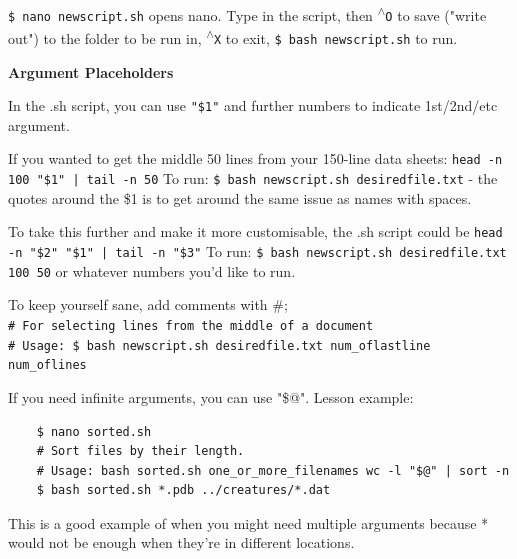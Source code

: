 \documentclass[12pt]{article}
\begin{document}
\texttt{\$ nano newscript.sh} opens nano. Type in the script, then \texttt{\textsuperscript{$\wedge$}O} to save ("write out") to the folder to be run in, \texttt{\textsuperscript{$\wedge$}X} to exit, \texttt{\$ bash newscript.sh} to run.

\textbf{Argument Placeholders}

In the .sh script, you can use \texttt{"\$1"} and further numbers to indicate 1st/2nd/etc argument.

If you wanted to get the middle 50 lines from your 150-line data sheets: \texttt{head -n 100 "\$1" | tail -n 50} To run: \texttt{\$ bash newscript.sh desiredfile.txt} - the quotes around the \$1 is to get around the same issue as names with spaces.

To take this further and make it more customisable, the .sh script could be \texttt{head -n "\$2" "\$1" | tail -n "\$3"} To run: \texttt{\$ bash newscript.sh desiredfile.txt 100 50} or whatever numbers you'd like to run.

To keep yourself sane, add comments with \#; 
\\\texttt{\# For selecting lines from the middle of a document}
\\\texttt{\# Usage: \$ bash newscript.sh desiredfile.txt num\_oflastline num\_oflines}

If you need infinite arguments, you can use "\$@". Lesson example:
\vspace{-1em}\begin{verbatim}
    $ nano sorted.sh
    # Sort files by their length.
    # Usage: bash sorted.sh one_or_more_filenames wc -l "$@" | sort -n
    $ bash sorted.sh *.pdb ../creatures/*.dat
\end{verbatim}\vspace{-1em} This is a good example of when you might need multiple arguments because * would not be enough when they're in different locations.
\end{document}
